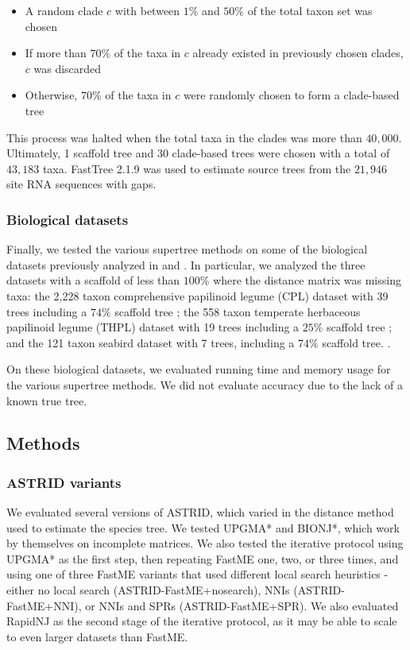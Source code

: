 \begin{itemize}
    \item A random clade $c$ with between $1\%$ and $50\%$ of the total taxon set was chosen
    \item If more than $70\%$ of the taxa in $c$ already existed in previously chosen clades, $c$ was discarded
    \item Otherwise, $70\%$ of the taxa in $c$ were randomly chosen to form a clade-based tree
\end{itemize}

This process was halted when the total taxa in the clades was more than $40,000$. Ultimately, 1 scaffold tree and 30 clade-based trees were chosen with a total of $43,183$ taxa. FastTree 2.1.9 \cite{price2010fasttree} was used to estimate source trees from the $21,946$ site RNA sequences with gaps.

\subsubsection{Biological datasets}

Finally, we tested the various supertree methods on some of the  biological datasets previously analyzed in \cite{fastrfs} and \cite{superfine}. In particular, we analyzed the three datasets with a scaffold of less than $100\%$ where the distance matrix was missing taxa: the 2,228 taxon comprehensive papilinoid legume (CPL) dataset with 39 trees including a $74\%$ scaffold tree \cite{mcmahon2006phylogenetic}; the 558 taxon temperate herbaceous papilinoid legume (THPL) dataset with 19 trees including a $25\%$ scaffold tree \cite{wojciechowski2000molecular}; and the 121 taxon seabird dataset with 7 trees, including a $74\%$ scaffold tree. \cite{kennedy2002seabird}.

On these biological datasets, we evaluated running time and memory usage for the various supertree methods. We did not evaluate accuracy due to the lack of a known true tree.

\subsection{Methods}

\subsubsection{ASTRID variants}

We evaluated several versions of ASTRID, which varied in the distance method used to estimate the species tree. We tested UPGMA* and BIONJ*, which work by themselves on incomplete matrices. We also tested the iterative protocol using UPGMA* as the first step, then repeating FastME one, two, or three times, and using one of three FastME variants that used different local search heuristics - either no local search (ASTRID-FastME+nosearch), NNIs (ASTRID-FastME+NNI), or NNIs and SPRs (ASTRID-FastME+SPR). We also evaluated RapidNJ as the second stage of the iterative protocol, as it may be able to scale to even larger datasets than FastME.

